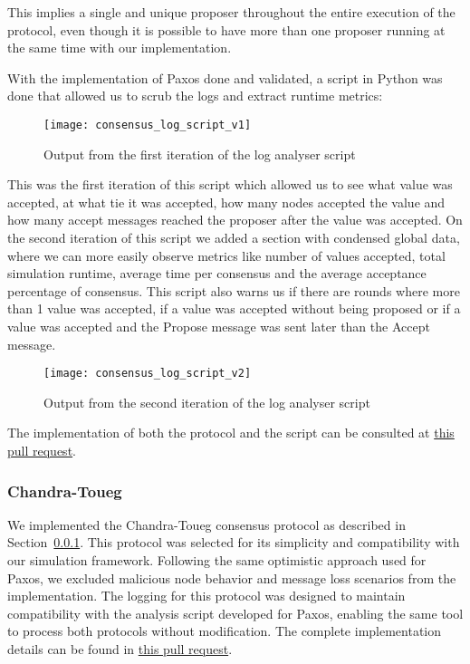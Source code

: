 This implies a single and unique proposer throughout the entire execution of the protocol, even though it is possible
to have more than one proposer running at the same time with our implementation.

With the implementation of Paxos done and validated, a script in Python was done that allowed us to
scrub the logs and extract runtime metrics:

\begin{figure}[h]
	\centering
	\texttt{[image: consensus\_log\_script\_v1]}
	\caption{Output from the first iteration of the log analyser script}
	\label{fig:consensus_log_script_v1}
\end{figure}

This was the first iteration of this script which allowed us to see what value was accepted,
at what tie it was accepted, how many nodes accepted the value and how many accept messages
reached the proposer after the value was accepted. 
On the second iteration of this script we added a section with condensed global data, where we can more
easily observe metrics like number of values accepted, total simulation runtime, average time per consensus
and the average acceptance percentage of consensus.
This script also warns us if there are rounds where more than 1 value was accepted, if a value was
accepted without being proposed or if a value was accepted and the Propose message was sent later than the Accept message.

\begin{figure}[h]
	\centering
	\texttt{[image: consensus\_log\_script\_v2]}
	\caption{Output from the second iteration of the log analyser script}
	\label{fig:consensus_log_script_v2}
\end{figure}

The implementation of both the protocol and
the script can be consulted at \href{https://github.com/RMLoureiro/MOBS/pull/2}{this pull request}.

\subsubsection{Chandra-Toueg}\label{sub:chandra-toueg}

We implemented the Chandra-Toueg consensus protocol as described in Section~\ref{sub:chandra-toueg}.
This protocol was selected for its simplicity and compatibility with our simulation framework.
Following the same optimistic approach used for Paxos, we excluded malicious node behavior and
message loss scenarios from the implementation. The logging for this protocol was designed to maintain
compatibility with the analysis script developed for Paxos, enabling the same tool to process
both protocols without modification. The complete implementation details can be found in
\href{https://github.com/RMLoureiro/MOBS/pull/4}{this pull request}.

